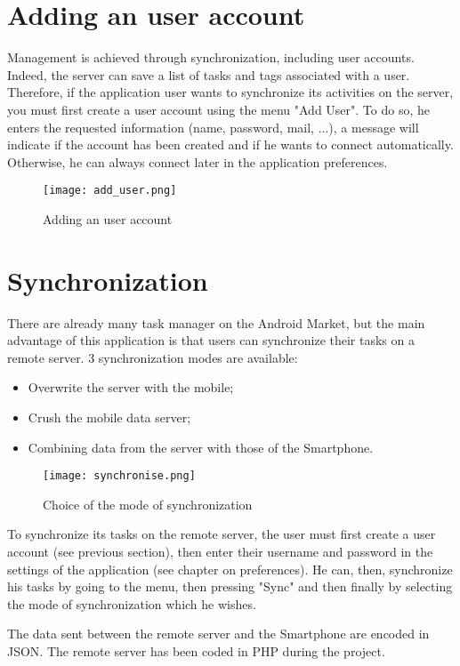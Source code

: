 \section{Adding an user account}

Management is achieved through synchronization, including user accounts. Indeed, the server can save a list of tasks and tags associated with a user. Therefore, if the application user wants to synchronize its activities on the server, you must first create a user account using the menu "Add User".
To do so, he enters the requested information (name, password, mail, ...), a message will indicate if the account has been created and if he wants to connect automatically. Otherwise, he can always connect later in the application preferences.

\begin{figure}[!ht]
	\centering
    \texttt{[image: add\_user.png]}
    \caption{Adding an user account}
\end{figure}

\section{Synchronization}

There are already many task manager on the Android Market, but the main advantage of this application is that users can synchronize their tasks on a remote server.
3 synchronization modes are available:
\begin{itemize}
    \item Overwrite the server with the mobile;
    \item Crush the mobile data server;
    \item Combining data from the server with those of the Smartphone.
\end{itemize}

\begin{figure}[!ht]
	\centering
    \texttt{[image: synchronise.png]}
    \caption{Choice of the mode of synchronization}
\end{figure}

To synchronize its tasks on the remote server, the user must first create a user account (see previous section), then enter their username and password in the settings of the application (see chapter on preferences). He can, then, synchronize his tasks by going to the menu, then pressing "Sync" and then finally by selecting the mode of synchronization which he wishes.

The data sent between the remote server and the Smartphone are encoded in JSON. The remote server has been coded in PHP during the project.

\clearpage
